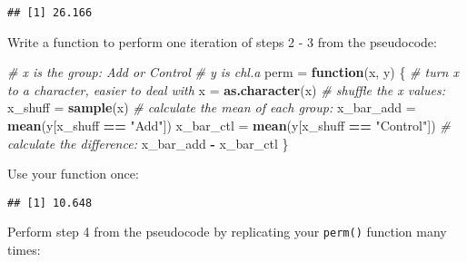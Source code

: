 \documentclass[]{book}
\newenvironment{Shaded}{\begin{snugshade}}{\end{snugshade}}
\newcommand{\CommentTok}[1]{\textcolor[rgb]{0.56,0.35,0.01}{\textit{#1}}}
\newcommand{\ControlFlowTok}[1]{\textcolor[rgb]{0.13,0.29,0.53}{\textbf{#1}}}
\newcommand{\DataTypeTok}[1]{\textcolor[rgb]{0.13,0.29,0.53}{#1}}
\newcommand{\DecValTok}[1]{\textcolor[rgb]{0.00,0.00,0.81}{#1}}
\newcommand{\KeywordTok}[1]{\textcolor[rgb]{0.13,0.29,0.53}{\textbf{#1}}}
\newcommand{\NormalTok}[1]{#1}
\newcommand{\OperatorTok}[1]{\textcolor[rgb]{0.81,0.36,0.00}{\textbf{#1}}}
\newcommand{\StringTok}[1]{\textcolor[rgb]{0.31,0.60,0.02}{#1}}
\begin{document}
\begin{verbatim}
## [1] 26.166
\end{verbatim}

Write a function to perform one iteration of steps 2 - 3 from the pseudocode:

\begin{Shaded}
\begin{Highlighting}[]
\CommentTok{# x is the group: Add or Control}
\CommentTok{# y is chl.a}
\NormalTok{perm =}\StringTok{ }\ControlFlowTok{function}\NormalTok{(x, y) \{}
  \CommentTok{# turn x to a character, easier to deal with}
\NormalTok{  x =}\StringTok{ }\KeywordTok{as.character}\NormalTok{(x)}
  \CommentTok{# shuffle the x values:}
\NormalTok{  x_shuff =}\StringTok{ }\KeywordTok{sample}\NormalTok{(x)}
  \CommentTok{# calculate the mean of each group:}
\NormalTok{  x_bar_add =}\StringTok{ }\KeywordTok{mean}\NormalTok{(y[x_shuff }\OperatorTok{==}\StringTok{ "Add"}\NormalTok{])}
\NormalTok{  x_bar_ctl =}\StringTok{ }\KeywordTok{mean}\NormalTok{(y[x_shuff }\OperatorTok{==}\StringTok{ "Control"}\NormalTok{])}
  \CommentTok{# calculate the difference:}
\NormalTok{  x_bar_add }\OperatorTok{-}\StringTok{ }\NormalTok{x_bar_ctl}
\NormalTok{\}}
\end{Highlighting}
\end{Shaded}

Use your function once:

\begin{Shaded}
\end{Shaded}

\begin{verbatim}
## [1] 10.648
\end{verbatim}

Perform step 4 from the pseudocode by replicating your \texttt{perm()} function many times:

\begin{Shaded}
\end{Shaded}
\end{document}
